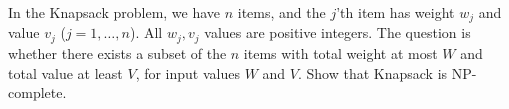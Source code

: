 \problem{}
In the Knapsack problem, we have $n$ items, and the $j$'th item has weight $w_j$ and value $v_j$ ($j=1,\ldots,n$).  All $w_j, v_j$ values are positive integers. The question is whether there exists a subset of the $n$ items with total weight at most $W$ and total value at least $V$, for input values $W$ and $V$.  Show that Knapsack is NP-complete.

\solution{}

\newpage
